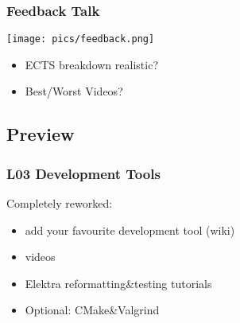 \begin{frame}
	\frametitle{Feedback Talk}

	\hfill \texttt{[image: pics/feedback.png]}
	\vspace{-1cm}
	\begin{itemize}
		\item ECTS breakdown realistic?
		\item Best/Worst Videos?
	\end{itemize}
\end{frame}

\subsection{Preview}

\begin{frame}
	\frametitle{L03 Development Tools}

	Completely reworked:

	\begin{itemize}
	\item add your favourite development tool (wiki)
	\item videos
	\item Elektra reformatting\&testing tutorials
	\item Optional: CMake\&Valgrind
	\end{itemize}
\end{frame}



\nocite{raab2017introducing}

\appendix

\begin{frame}[allowframebreaks]
	
	
\end{frame}




